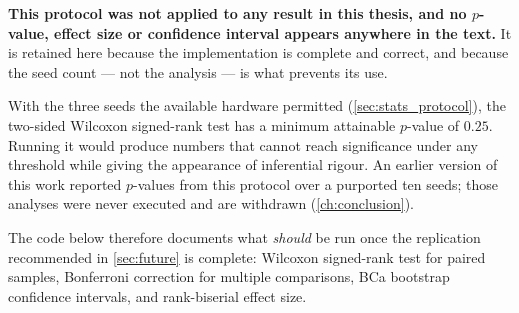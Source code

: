\textbf{This protocol was not applied to any result in this thesis, and no
$p$-value, effect size or confidence interval appears anywhere in the text.} It
is retained here because the implementation is complete and correct, and because
the seed count --- not the analysis --- is what prevents its use.

With the three seeds the available hardware permitted (\cref{sec:stats_protocol}),
the two-sided Wilcoxon signed-rank test has a minimum attainable $p$-value of
$0.25$. Running it would produce numbers that cannot reach significance under any
threshold while giving the appearance of inferential rigour. An earlier version of
this work reported $p$-values from this protocol over a purported ten seeds; those
analyses were never executed and are withdrawn (\cref{ch:conclusion}).

The code below therefore documents what \emph{should} be run once the replication
recommended in \cref{sec:future} is complete: Wilcoxon signed-rank test for paired
samples, Bonferroni correction for multiple comparisons, BCa bootstrap confidence
intervals, and rank-biserial effect size.

